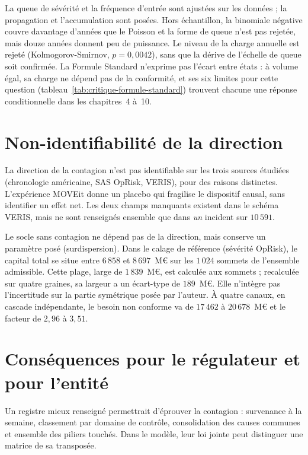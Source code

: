 La queue de sévérité et la fréquence d'entrée sont ajustées sur les données ; la propagation et
l'accumulation sont posées. Hors échantillon, la binomiale négative couvre davantage d'années
que le Poisson et la forme de queue n'est pas rejetée, mais douze années donnent peu de puissance.
Le niveau de la charge annuelle est rejeté
(Kolmogorov-Smirnov, $p = 0{,}0042$), sans que la dérive de l'échelle de queue soit confirmée. La
Formule Standard n'exprime pas l'écart entre états : à volume égal, sa charge ne dépend pas de la
conformité, et ses six limites pour cette question (tableau~\ref{tab:critique-formule-standard})
trouvent chacune une réponse conditionnelle dans les chapitres~4 à~10.


\section*{Non-identifiabilité de la direction}
La direction de la contagion n'est pas identifiable sur les trois sources étudiées
(chronologie américaine, SAS OpRisk, VERIS), pour des raisons distinctes. L'expérience
MOVEit donne un placebo qui fragilise le dispositif causal, sans identifier un effet net. Les deux champs manquants existent
dans le schéma VERIS, mais ne sont renseignés ensemble que dans \emph{un} incident sur $10\,591$.

Le socle sans contagion ne dépend pas de la direction, mais conserve un paramètre posé
(surdispersion). Dans le calage de référence (sévérité OpRisk), le capital total se situe entre
$6\,858$ et $8\,697$~M\euro{} sur les $1\,024$ sommets de l'ensemble admissible. Cette plage, large de $1\,839$~M\euro{}, est calculée aux sommets ; recalculée sur quatre graines, sa largeur a un écart-type de $189$~M\euro. Elle n'intègre pas l'incertitude sur la partie symétrique posée par l'auteur. À quatre canaux, en cascade indépendante, le besoin non conforme va de $17\,462$ à $20\,678$~M\euro{} et le facteur de $2{,}96$ à $3{,}51$.


\section*{Conséquences pour le régulateur et pour l'entité}
Un registre mieux renseigné permettrait d'éprouver la contagion : survenance à la semaine, classement
par domaine de contrôle, consolidation des causes communes et ensemble des piliers
touchés. Dans le modèle, leur loi jointe peut distinguer une matrice de sa transposée.

